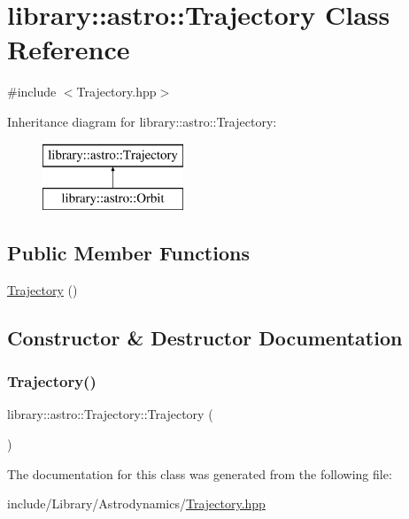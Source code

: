 \hypertarget{classlibrary_1_1astro_1_1_trajectory}{}\section{library\+:\+:astro\+:\+:Trajectory Class Reference}
\label{classlibrary_1_1astro_1_1_trajectory}


{\ttfamily \#include $<$Trajectory.\+hpp$>$}

Inheritance diagram for library\+:\+:astro\+:\+:Trajectory\+:\begin{figure}[H]
\begin{center}
\leavevmode
\includegraphics[height=2.000000cm]{classlibrary_1_1astro_1_1_trajectory}
\end{center}
\end{figure}
\subsection*{Public Member Functions}
\begin{DoxyCompactItemize}
\item 
\hyperlink{classlibrary_1_1astro_1_1_trajectory_a5e62e12ff8ca21934171081eadc90461}{Trajectory} ()
\end{DoxyCompactItemize}


\subsection{Constructor \& Destructor Documentation}
\mbox{\label{classlibrary_1_1astro_1_1_trajectory_a5e62e12ff8ca21934171081eadc90461}} 
\subsubsection{\texorpdfstring{Trajectory()}{Trajectory()}}
{\footnotesize\ttfamily library\+::astro\+::\+Trajectory\+::\+Trajectory (\begin{DoxyParamCaption}{ }\end{DoxyParamCaption})}



The documentation for this class was generated from the following file\+:\begin{DoxyCompactItemize}
\item 
include/\+Library/\+Astrodynamics/\hyperlink{_trajectory_8hpp}{Trajectory.\+hpp}\end{DoxyCompactItemize}
